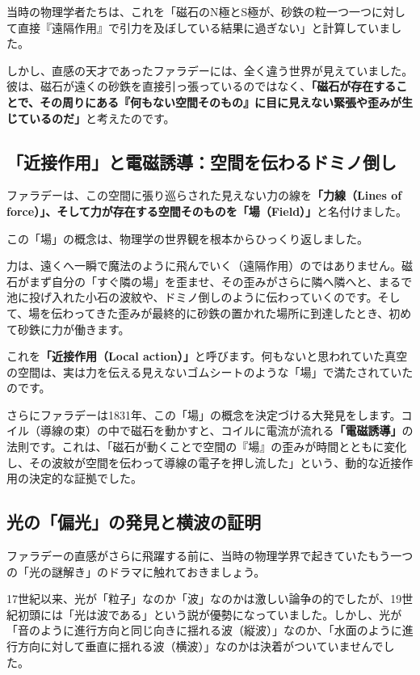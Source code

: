 当時の物理学者たちは、これを「磁石のN極とS極が、砂鉄の粒一つ一つに対して直接『遠隔作用』で引力を及ぼしている結果に過ぎない」と計算していました。

しかし、直感の天才であったファラデーには、全く違う世界が見えていました。彼は、磁石が遠くの砂鉄を直接引っ張っているのではなく、\textbf{「磁石が存在することで、その周りにある『何もない空間そのもの』に目に見えない緊張や歪みが生じているのだ」}と考えたのです。

\subsection{「近接作用」と電磁誘導：空間を伝わるドミノ倒し}

ファラデーは、この空間に張り巡らされた見えない力の線を\textbf{「力線（Lines of force）」、そして力が存在する空間そのものを「場（Field）」}と名付けました。

この「場」の概念は、物理学の世界観を根本からひっくり返しました。

力は、遠くへ一瞬で魔法のように飛んでいく（遠隔作用）のではありません。磁石がまず自分の「すぐ隣の場」を歪ませ、その歪みがさらに隣へ隣へと、まるで池に投げ入れた小石の波紋や、ドミノ倒しのように伝わっていくのです。そして、場を伝わってきた歪みが最終的に砂鉄の置かれた場所に到達したとき、初めて砂鉄に力が働きます。

これを\textbf{「近接作用（Local action）」}と呼びます。何もないと思われていた真空の空間は、実は力を伝える見えないゴムシートのような「場」で満たされていたのです。

さらにファラデーは1831年、この「場」の概念を決定づける大発見をします。コイル（導線の束）の中で磁石を動かすと、コイルに電流が流れる\textbf{「電磁誘導」}の法則です。これは、「磁石が動くことで空間の『場』の歪みが時間とともに変化し、その波紋が空間を伝わって導線の電子を押し流した」という、動的な近接作用の決定的な証拠でした。

\subsection{光の「偏光」の発見と横波の証明}

ファラデーの直感がさらに飛躍する前に、当時の物理学界で起きていたもう一つの「光の謎解き」のドラマに触れておきましょう。

17世紀以来、光が「粒子」なのか「波」なのかは激しい論争の的でしたが、19世紀初頭には「光は波である」という説が優勢になっていました。しかし、光が「音のように進行方向と同じ向きに揺れる波（縦波）」なのか、「水面のように進行方向に対して垂直に揺れる波（横波）」なのかは決着がついていませんでした。

